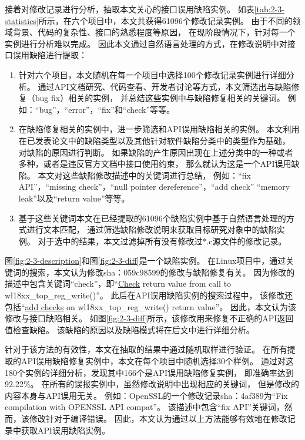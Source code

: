 接着对修改记录进行分析，抽取本文关心的接口误用缺陷实例。
如表\ref{tab:2-3-statistics}所示，在六个项目中，本文共获得61096个修改记录实例。
由于不同的领域背景、代码的复杂性、接口的熟悉程度等原因，
在现阶段情况下，针对每一个实例进行分析难以完成。
因此本文通过自然语言处理的方式，在修改说明中对接口误用缺陷进行提取：
\begin{enumerate}
	\item 针对六个项目，本文随机在每一个项目中选择100个修改记录实例进行详细分析。
	通过API文档研究、代码查看、开发者讨论等方式，本文筛选出与缺陷修复（bug fix）相关的实例，
	并总结这些实例中与缺陷修复相关的关键词。
	例如：“bug”，“error”，“fix”和“check”等等。
	\item 在缺陷修复相关的实例中，进一步筛选和API误用缺陷相关的实例。
	本文利用在已发表论文中的缺陷类型以及其他针对软件缺陷分类中的类型作为基础，
	对缺陷的原因进行判断。
	如果缺陷的产生原因出现在上述分类中的一种或者多种，或者是违反官方文档中接口使用约束，
	那么就认为这是一个API误用缺陷。
	本文对这些缺陷修改描述中的关键词进行总结，
	例如：“fix API”，“missing check”，“null pointer dereference”，“add check” “memory leak”以及“return value”等等。
	\item 基于这些关键词本文在已经提取的61096个缺陷实例中基于自然语言处理的方式进行文本匹配，
	通过筛选缺陷修改说明来获取目标研究对象中的缺陷实例。
	对于选中的结果，本文过滤掉所有没有修改过*.c源文件的修改记录。
\end{enumerate}

图\ref{fig:2-3-description}和图\ref{fig:2-3-diff}是一个缺陷实例。
在Linux项目中，通过关键词的搜索，本文认为修改sha：059c98599的修改与缺陷修复有关。
因为修改的描述中包含关键词“check”，即“\underline{Check} return value from call to wl18xx\_top\_reg\_write()”。
此后在API误用缺陷实例的搜索过程中，
该修改还包括“\underline{add checks} on wl18xx\_top\_reg\_write() return value”。
因此，本文认为该修改与接口缺陷相关。
如图\ref{fig:2-3-diff}所示，该修改用来修复不正确的API返回值检查缺陷。
该缺陷的原因以及缺陷模式将在后文中进行详细分析。

针对于该方法的有效性，本文在抽取的结果中通过随机取样进行验证。
在所有提取的API误用缺陷修复实例中，本文在每个项目中随机选择30个样例。
通过对这180个实例的详细分析，发现其中166个是API误用缺陷修复实例，
即准确率达到92.22\%。
在所有的误报实例中，虽然修改说明中出现相应的关键词，
但是修改的内容本身与API误用无关。
例如：OpenSSL的一个修改记录sha：4af389为“Fix compilation with OPENSSL API compat”。
该描述中包含“fix API”关键词，然而，该修改针对于编译错误。
因此，本文认为通过以上方法能够有效地在修改记录中获取API误用缺陷实例。

